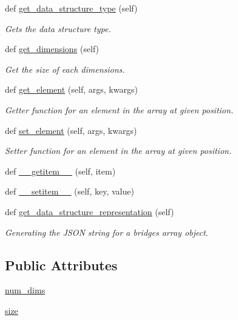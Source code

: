 \begin{DoxyCompactItemize}
def \mbox{\hyperlink{classbridges_1_1array_1_1_array_a27dcb7a04798a215092f42506da679ce}{get\+\_\+data\+\_\+structure\+\_\+type}} (self)
\begin{DoxyCompactList}\small\item\em Gets the data structure type. \end{DoxyCompactList}\item 
def \mbox{\hyperlink{classbridges_1_1array_1_1_array_ae224fa7fe9363e2d47231e36638b500f}{get\+\_\+dimensions}} (self)
\begin{DoxyCompactList}\small\item\em Get the size of each dimensions. \end{DoxyCompactList}\item 
def \mbox{\hyperlink{classbridges_1_1array_1_1_array_ae02a649c2d9a1b830b36650d5a308105}{get\+\_\+element}} (self, args, kwargs)
\begin{DoxyCompactList}\small\item\em Getter function for an element in the array at given position. \end{DoxyCompactList}\item 
def \mbox{\hyperlink{classbridges_1_1array_1_1_array_a371bbcb9aa75562a2c3f04ef1bb33faf}{set\+\_\+element}} (self, args, kwargs)
\begin{DoxyCompactList}\small\item\em Setter function for an element in the array at given position. \end{DoxyCompactList}\item 
def \mbox{\hyperlink{classbridges_1_1array_1_1_array_ad97d5a2cb4bffa4a6bcdb15a3ece0974}{\+\_\+\+\_\+getitem\+\_\+\+\_\+}} (self, item)
\item 
def \mbox{\hyperlink{classbridges_1_1array_1_1_array_a97fd57b09a0b8ae221ecaa50c1c483b1}{\+\_\+\+\_\+setitem\+\_\+\+\_\+}} (self, key, value)
\item 
def \mbox{\hyperlink{classbridges_1_1array_1_1_array_a7c6af86feb0ec470afe56505d9ce0cc8}{get\+\_\+data\+\_\+structure\+\_\+representation}} (self)
\begin{DoxyCompactList}\small\item\em Generating the J\+S\+ON string for a bridges array object. \end{DoxyCompactList}\end{DoxyCompactItemize}
\subsection*{Public Attributes}
\begin{DoxyCompactItemize}
\item 
\mbox{\hyperlink{classbridges_1_1array_1_1_array_a2c28c3658312289dc2ae78f4099d4c76}{num\+\_\+dims}}
\item 
\mbox{\hyperlink{classbridges_1_1array_1_1_array_aeac1b1639d0284500f354d41b40c38f7}{size}}
\end{DoxyCompactItemize}

